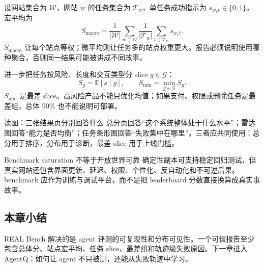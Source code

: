 设网站集合为 $\mathcal{W}$，网站 $w$ 的任务集合为 $\mathcal{T}_w$，单任务成功指示为 $s_{w,t}\in\{0,1\}$。宏平均为
\[
S_{\text{macro}}=\frac{1}{|\mathcal{W}|}\sum_{w\in\mathcal{W}}
\frac{1}{|\mathcal{T}_w|}\sum_{t\in\mathcal{T}_w}s_{w,t}.
\]
$S_{\text{macro}}$ 让每个站点等权；微平均则让任务多的站点权重更大。报告必须说明使用哪种聚合，否则同一结果可能被讲成不同故事。

进一步把任务按风险、长度和交互类型分 slice $g\in\mathcal{G}$：
\[
S_g=\mathbb{E}[s\mid g],\qquad
S_{\min}=\min_{g\in\mathcal{G}}S_g.
\]
$S_{\min}$ 是最差 slice。高风险产品不能只优化均值；如果支付、权限或删除任务是最差组，总体 90\% 也不能说明可部署。

\begin{knowledgebox}{读图：三张结果页分别回答什么}
总分页回答“这个系统整体处于什么水平”；雷达图回答“能力是否均衡”；任务条形图回答“失败集中在哪里”。三者应共同使用：总分用于排序，分布用于诊断，最差 slice 用于上线门槛。
\end{knowledgebox}

\begin{warningbox}{Benchmark saturation 不等于开放世界可靠}
确定性副本可支持稳定回归测试，但真实网站还包含界面更新、延迟、权限、个性化、反自动化和不可逆后果。benchmark 应作为训练与调试平台，而不是把 leaderboard 分数直接换算成真实事故率。
\end{warningbox}


\subsection{本章小结}

REAL Bench 解决的是 agent 评测的可复现性和分布可见性。一个可信报告至少包含总体分、站点宏平均、任务 slice、最差组和轨迹级失败原因。下一章进入 AgentQ：如何让 agent 不只被测，还能从失败轨迹中学习。

